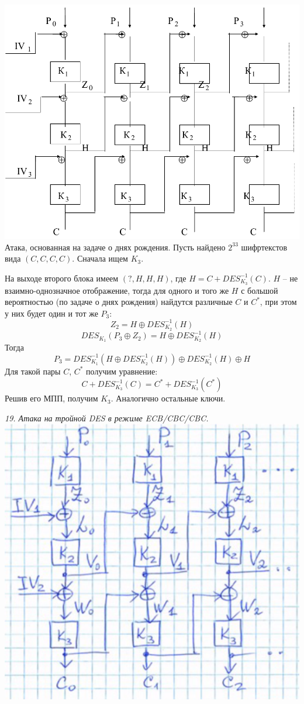 \includegraphics[scale=.4]{eka/img/CBC_CBC_CBC.png} \\

Атака, основанная на задаче о днях рождения. Пусть найдено $2^{33}$ шифртекстов вида $(C, C, C, C)$. Сначала ищем $K_3$.

На выходе второго блока имеем $(?, H, H, H)$, где $H = C + DES_{K_3}^{-1}(C)$. $H$ -- не взаимно-однозначное отображение, тогда для одного и того же $H$ с большой вероятностью (по задаче о днях рождения) найдутся различные $C$ и $C^*$, при этом у них будет один и тот же $P_3$:
$$Z_2 = H \oplus DES_{K_2}^{-1}(H)$$
$$DES_{K_1}(P_3 \oplus Z_2) = H \oplus DES_{K_2}^{-1}(H)$$
Тогда
$$P_3 = DES_{K_1}^{-1}(H \oplus DES_{K_2}^{-1}(H)) \oplus DES_{K_2}^{-1}(H) \oplus H$$
Для такой пары $C$, $C^*$ получим уравнение:
$$C + DES_{K_3}^{-1}(C) = C^* + DES_{K_3}^{-1}(C^*)$$
Решив его МПП, получим $K_3$. Аналогично остальные ключи.

\newpage
\noindent \textit{19. Атака на тройной DES в режиме ECB/CBC/CBC.} \\

\includegraphics[scale=.5]{eka/img/ECB_CBC_CBC.png} \\

